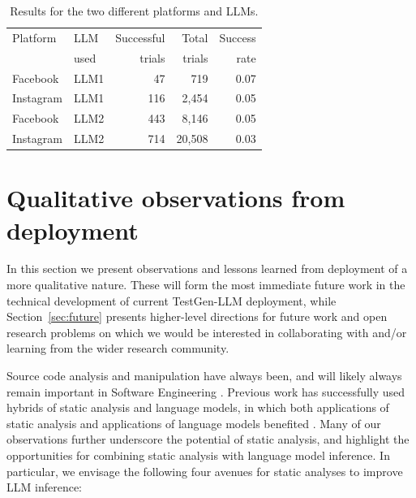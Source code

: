 \documentclass[sigconf,screen]{acmart}
\begin{document}
\begin{table}
\begin{tabular}{||l l | r |r | r ||} 
 \hline
 Platform    & LLM           & Successful & Total  & Success \\
             & used          & trials     & trials & rate    \\
\hline   
Facebook     & LLM1         & 47          &	719	   & 0.07 \\
Instagram    & LLM1         & 116         & 2,454  & 0.05 \\
Facebook     & LLM2         & 443	      &  8,146 & 0.05 \\
Instagram    & LLM2         & 714	      & 20,508 & 0.03 \\
 \hline
\end{tabular}
\caption{Results for the two different platforms and LLMs. }
\label{tab:llm-platform-ranks}
\end{table}















\section{Qualitative observations from deployment}
In this section we present observations and lessons learned from deployment of a more qualitative nature.
These will form the most immediate future work in the technical development of current TestGen-LLM deployment, while
Section~\ref{sec:future} presents higher-level directions for future work and open research problems on which we would be interested in collaborating with and/or learning from the wider research community.

Source code analysis and manipulation have always been, and will likely always remain important in Software  Engineering \cite{mh:scam10-keynote}.
Previous work has successfully used  hybrids of static analysis and language models, in which both applications of static analysis and applications of language models benefited  \cite{mutasim:leveraging,ahmed_improving_2023,li:assisting,jin:inferfix}.
Many of our observations further underscore the potential of static analysis,  and highlight the opportunities for combining static analysis with language model inference.
In particular, we envisage the following four avenues for static analyses to improve LLM inference:
\end{document}
